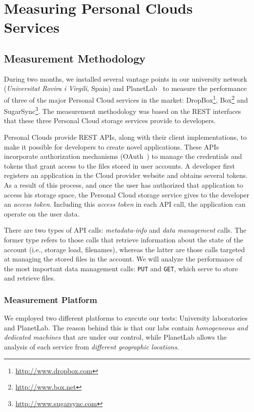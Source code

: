 \chapter{Measuring Personal Clouds Services}

\section{Measurement Methodology}
During two months, we installed several
vantage points in our university network (\textit{Universitat
Rovira i Virgili}, Spain) and PlanetLab~\cite{planetlab}  
to measure the performance of three of the major Personal Cloud services in the market: DropBox\footnote{\url{http://www.dropbox.com}}, Box\footnote{\url{http://www.box.net}} 
and SugarSync\footnote{\url{http://www.sugarsync.com}}. The measurement methodology was based on the REST interfaces that these three Personal Cloud storage services provide to developers.

Personal Clouds provide REST APIs, along with
their client implementations, to make it possible for developers to
create novel applications. These APIs incorporate authorization
mechanisms (OAuth~\cite{oauth}) to manage the credentials and tokens
that grant access to the files stored in user accounts. A
developer first registers an application 
in the Cloud provider website and obtains several tokens.
As a result of this process, and once the user has authorized
that application to access his storage space, the Personal Cloud storage service
gives to the developer an \textit{access token}. Including this \textit{access token} in each API call, the application can operate on the user data.

There are two types of API calls: \textit{metadata-info} and
\textit{data management} calls. The former type refers to
those calls that retrieve information about the state of the
account (i.e., storage load, filenames), whereas the latter
are those calls targeted at managing the stored files
in the account. %
We will analyze the performance
of the most important data management calls: \texttt{PUT} and \texttt{GET},
which serve to store and retrieve files.  


\subsection{Measurement Platform} 

We employed two different platforms
to execute our tests: University laboratories and PlanetLab.
The reason behind this is that our labs contain
\textit{homogeneous and dedicated machines} that are under our control,
while PlanetLab allows the analysis of each service from \textit{different geographic locations}. 

